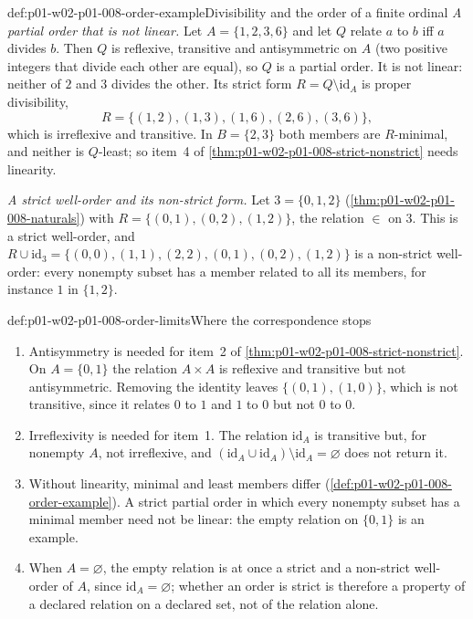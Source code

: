 \begin{hbexample}{def:p01-w02-p01-008-order-example}{Divisibility and the order of a finite ordinal}
\emph{A partial order that is not linear.} Let \(A=\{1,2,3,6\}\) and let
\(Q\) relate \(a\) to \(b\) iff \(a\) divides \(b\). Then \(Q\) is
reflexive, transitive and antisymmetric on \(A\) (two positive integers that
divide each other are equal), so \(Q\) is a partial order. It is not linear:
neither of \(2\) and \(3\) divides the other. Its strict form
\(R=Q\setminus\mathrm{id}_A\) is proper divisibility,
\[
  R=\{(1,2),(1,3),(1,6),(2,6),(3,6)\},
\]
which is irreflexive and transitive. In \(B=\{2,3\}\) both members are
\(R\)-minimal, and neither is \(Q\)-least; so item~4 of
\cref{thm:p01-w02-p01-008-strict-nonstrict} needs linearity.

\emph{A strict well-order and its non-strict form.} Let
\(3=\{0,1,2\}\) (\cref{thm:p01-w02-p01-008-naturals}) with
\(R=\{(0,1),(0,2),(1,2)\}\), the relation \(\in\) on \(3\). This is a strict
well-order, and
\(R\cup\mathrm{id}_3=\{(0,0),(1,1),(2,2),(0,1),(0,2),(1,2)\}\) is a
non-strict well-order: every nonempty subset has a member related to all its
members, for instance \(1\) in \(\{1,2\}\).
\end{hbexample}

\begin{hbwarning}{def:p01-w02-p01-008-order-limits}{Where the correspondence stops}
\begin{enumerate}
  \item Antisymmetry is needed for item~2 of
        \cref{thm:p01-w02-p01-008-strict-nonstrict}. On \(A=\{0,1\}\) the
        relation \(A\times A\) is reflexive and transitive but not
        antisymmetric. Removing the identity leaves
        \(\{(0,1),(1,0)\}\), which is not transitive, since it relates
        \(0\) to \(1\) and \(1\) to \(0\) but not \(0\) to \(0\).
  \item Irreflexivity is needed for item~1. The relation \(\mathrm{id}_A\)
        is transitive but, for nonempty \(A\), not irreflexive, and
        \((\mathrm{id}_A\cup\mathrm{id}_A)\setminus\mathrm{id}_A=\varnothing\)
        does not return it.
  \item Without linearity, minimal and least members differ
        (\cref{def:p01-w02-p01-008-order-example}). A strict partial order in
        which every nonempty subset has a minimal member need not be
        linear: the empty relation on \(\{0,1\}\) is an example.
  \item When \(A=\varnothing\), the empty relation is at once a strict and a
        non-strict well-order of \(A\), since \(\mathrm{id}_A=\varnothing\);
        whether an order is strict is therefore a property of a declared
        relation on a declared set, not of the relation alone.
\end{enumerate}
\end{hbwarning}

